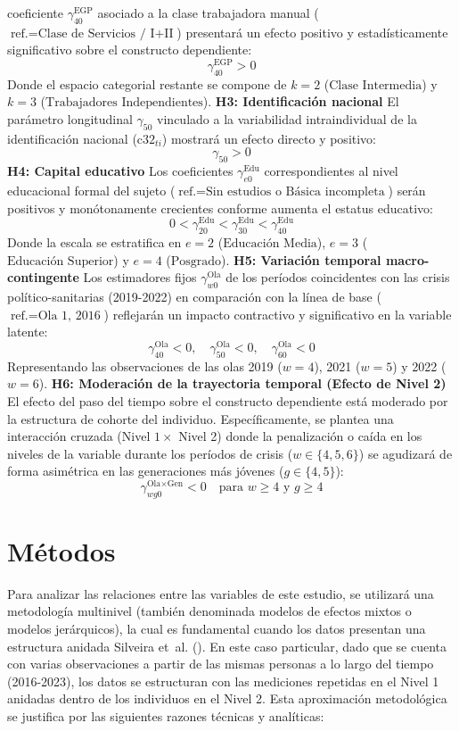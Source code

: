 \documentclass[
  spanish,
  a4paper,
  oneside]{scrbook}
\begin{document}
coeficiente \(\gamma^{\text{EGP}}_{40}\) asociado a la clase trabajadora
manual (\(\text{ref.} = \text{Clase de Servicios / I+II}\)) presentará
un efecto positivo y estadísticamente significativo sobre el constructo
dependiente: \[\gamma^{\text{EGP}}_{40} > 0\] Donde el espacio
categorial restante se compone de \(k=2\) (\(\text{Clase Intermedia}\))
y \(k=3\) (\(\text{Trabajadores Independientes}\)). \textbf{H3:
Identificación nacional} El parámetro longitudinal \(\gamma_{50}\)
vinculado a la variabilidad intraindividual de la identificación
nacional (\(\text{c32}_{ti}\)) mostrará un efecto directo y positivo:
\[\gamma_{50} > 0\] \textbf{H4: Capital educativo} Los coeficientes
\(\gamma^{\text{Edu}}_{e0}\) correspondientes al nivel educacional
formal del sujeto
(\(\text{ref.} = \text{Sin estudios o Básica incompleta}\)) serán
positivos y monótonamente crecientes conforme aumenta el estatus
educativo:
\[0 < \gamma^{\text{Edu}}_{20} < \gamma^{\text{Edu}}_{30} < \gamma^{\text{Edu}}_{40}\]
Donde la escala se estratifica en \(e=2\) (\(\text{Educación Media}\)),
\(e=3\) (\(\text{Educación Superior}\)) y \(e=4\) (\(\text{Posgrado}\)).
\textbf{H5: Variación temporal macro-contingente} Los estimadores fijos
\(\gamma^{\text{Ola}}_{w0}\) de los períodos coincidentes con las crisis
político-sanitarias (2019-2022) en comparación con la línea de base
(\(\text{ref.} = \text{Ola 1, 2016}\)) reflejarán un impacto contractivo
y significativo en la variable latente:
\[\gamma^{\text{Ola}}_{40} < 0, \quad \gamma^{\text{Ola}}_{50} < 0, \quad \gamma^{\text{Ola}}_{60} < 0\]
Representando las observaciones de las olas 2019 (\(w=4\)), 2021
(\(w=5\)) y 2022 (\(w=6\)). \textbf{H6: Moderación de la trayectoria
temporal (Efecto de Nivel 2)} El efecto del paso del tiempo sobre el
constructo dependiente está moderado por la estructura de cohorte del
individuo. Específicamente, se plantea una interacción cruzada (Nivel
\(1 \times\) Nivel 2) donde la penalización o caída en los niveles de la
variable durante los períodos de crisis (\(w \in \{4, 5, 6\}\)) se
agudizará de forma asimétrica en las generaciones más jóvenes
(\(g \in \{4, 5\}\)):
\[\gamma^{\text{Ola}\times\text{Gen}}_{wg0} < 0 \quad \text{para } w \geq 4 \text{ y } g \geq 4\]


\chapter{Métodos}\label{muxe9todos}

Para analizar las relaciones entre las variables de este estudio, se
utilizará una metodología multinivel (también denominada modelos de
efectos mixtos o modelos jerárquicos), la cual es fundamental cuando los
datos presentan una estructura anidada Silveira et~al.
(). En este caso
particular, dado que se cuenta con varias observaciones a partir de las
mismas personas a lo largo del tiempo (2016-2023), los datos se
estructuran con las mediciones repetidas en el Nivel 1 anidadas dentro
de los individuos en el Nivel 2. Esta aproximación metodológica se
justifica por las siguientes razones técnicas y analíticas:
\end{document}
